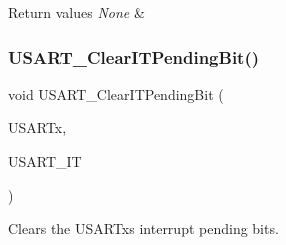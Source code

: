 \begin{DoxyRetVals}{Return values}
{\em None} & \\
\hline
\end{DoxyRetVals}
\mbox{\label{group___u_s_a_r_t_ga1fc25d0338695063be5e50156955d9bc}} 
\subsubsection{\texorpdfstring{U\+S\+A\+R\+T\+\_\+\+Clear\+I\+T\+Pending\+Bit()}{USART\_ClearITPendingBit()}}
{\footnotesize\ttfamily void U\+S\+A\+R\+T\+\_\+\+Clear\+I\+T\+Pending\+Bit (\begin{DoxyParamCaption}\item[{U\+S\+A\+R\+T\+\_\+\+Type\+Def $\ast$}]{U\+S\+A\+R\+Tx,  }\item[{uint16\+\_\+t}]{U\+S\+A\+R\+T\+\_\+\+IT }\end{DoxyParamCaption})}



Clears the U\+S\+A\+R\+Tx\textquotesingle{}s interrupt pending bits. 


